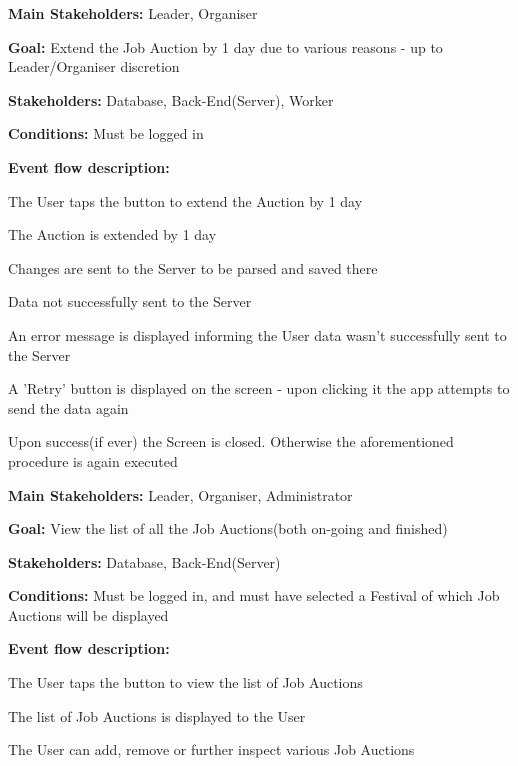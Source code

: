 			\noindent {}
			\begin{packed_item}
				\item \textbf{Main Stakeholders:} Leader, Organiser
				\item \textbf{Goal:} Extend the Job Auction by 1 day due to various reasons - up to Leader/Organiser discretion
				\item \textbf{Stakeholders: } Database, Back-End(Server), Worker
				\item \textbf{Conditions: } Must be logged in
				\item \textbf{Event flow description: }
				\begin{packed_enum}
					\item The User taps the button to extend the Auction by 1 day
					\item The Auction is extended by 1 day
					\item Changes are sent to the Server to be parsed and saved there
				\end{packed_enum}
				
				\begin{packed_item}
					\item[3.a] Data not successfully sent to the Server
					\item[] \begin{packed_enum}
						\item An error message is displayed informing the User data wasn't successfully sent to the Server
						\item A 'Retry' button is displayed on the screen - upon clicking it the app attempts to send the data again
						\item Upon success(if ever) the Screen is closed. Otherwise the aforementioned procedure is again executed
					\end{packed_enum}
				\end{packed_item}
			\end{packed_item}
		
			\noindent \underbar{\textbf{UC41 - View list of Job Auctions}}
			\begin{packed_item}
				\item \textbf{Main Stakeholders:} Leader, Organiser, Administrator
				\item \textbf{Goal:} View the list of all the Job Auctions(both on-going and finished)
				\item \textbf{Stakeholders: } Database, Back-End(Server)
				\item \textbf{Conditions: } Must be logged in, and must have selected a Festival of which Job Auctions will be displayed
				\item \textbf{Event flow description: }
				\begin{packed_enum}
					\item The User taps the button to view the list of Job Auctions
					\item The list of Job Auctions is displayed to the User
					\item The User can add, remove or further inspect various Job Auctions
				\end{packed_enum}
			\end{packed_item}
			
